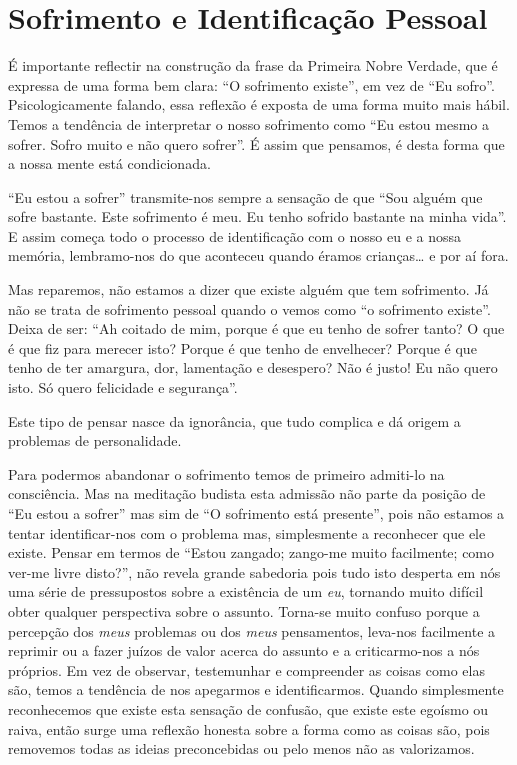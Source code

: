 \section{Sofrimento e Identificação Pessoal}

É importante reflectir na construção da frase da Primeira Nobre Verdade, que é
expressa de uma forma bem clara: “O sofrimento existe”, em vez de “Eu sofro”.
Psicologicamente falando, essa reflexão é exposta de uma forma muito mais hábil.
Temos a tendência de interpretar o nosso sofrimento como “Eu estou mesmo a
sofrer. Sofro muito e não quero sofrer”. É assim que pensamos, é desta forma que
a nossa mente está condicionada.

“Eu estou a sofrer” transmite-nos sempre a sensação de que “Sou alguém que sofre
bastante. Este sofrimento é meu. Eu tenho sofrido bastante na minha vida”. E
assim começa todo o processo de identificação com o nosso eu e a nossa memória,
lembramo-nos do que aconteceu quando éramos crianças\ldots{} e por aí fora.

Mas reparemos, não estamos a dizer que existe alguém que tem sofrimento. Já não
se trata de sofrimento pessoal quando o vemos como “o sofrimento existe”. Deixa
de ser: “Ah coitado de mim, porque é que eu tenho de sofrer tanto? O que é que
fiz para merecer isto? Porque é que tenho de envelhecer? Porque é que tenho de
ter amargura, dor, lamentação e desespero? Não é justo! Eu não quero isto. Só
quero felicidade e segurança”.

Este tipo de pensar nasce da ignorância, que tudo complica e dá origem a
problemas de personalidade.

Para podermos abandonar o sofrimento temos de primeiro admiti-lo na consciência.
Mas na meditação budista esta admissão não parte da posição de “Eu estou a
sofrer” mas sim de “O sofrimento está presente”, pois não estamos a tentar
identificar-nos com o problema mas, simplesmente a reconhecer que ele existe.
Pensar em termos de “Estou zangado; zango-me muito facilmente; como ver-me livre
disto?”, não revela grande sabedoria pois tudo isto desperta em nós uma série de
pressupostos sobre a existência de um \emph{eu}, tornando muito difícil obter
qualquer perspectiva sobre o assunto. Torna-se muito confuso porque a percepção
dos \emph{meus} problemas ou dos \emph{meus} pensamentos, leva-nos facilmente a
reprimir ou a fazer juízos de valor acerca do assunto e a criticarmo-nos a nós
próprios. Em vez de observar, testemunhar e compreender as coisas como elas são,
temos a tendência de nos apegarmos e identificarmos. Quando simplesmente
reconhecemos que existe esta sensação de confusão, que existe este egoísmo ou
raiva, então surge uma reflexão honesta sobre a forma como as coisas são, pois
removemos todas as ideias preconcebidas ou pelo menos não as valorizamos.

